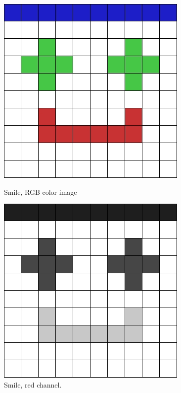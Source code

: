 \begin{figure}[ht]
    \begin{minipage}[t]{0.45\linewidth}
        \centering
        \includegraphics[width=\textwidth]{images/smile/smile-original.jpg}
        \caption{Smile, RGB color image}
        \label{fig:smile-rgb}
    \end{minipage}
    \hspace{0.5cm}
    \begin{minipage}[t]{0.45\linewidth}
        \centering
        \includegraphics[width=\textwidth]{images/smile/smile-red-channel.jpg}
        \caption{Smile, red channel.}
        \label{fig:smile-red}
    \end{minipage}
\end{figure}
